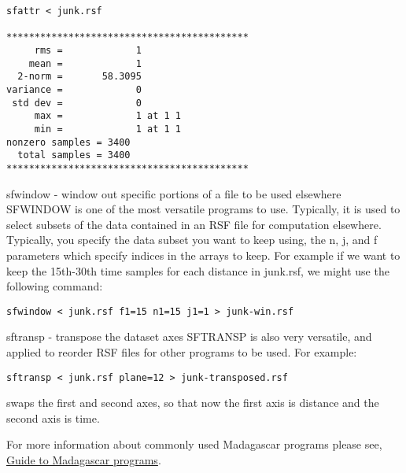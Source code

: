 \begin{verbatim}
sfattr < junk.rsf 
 
******************************************* 
     rms =             1 
    mean =             1 
  2-norm =       58.3095 
variance =             0 
 std dev =             0 
     max =             1 at 1 1 
     min =             1 at 1 1 
nonzero samples = 3400 
  total samples = 3400 
*******************************************
\end{verbatim}

sfwindow - window out specific portions of a file to be used elsewhere
SFWINDOW is one of the most versatile programs to use. Typically, it is used to select subsets of the data contained in an RSF file for computation elsewhere. Typically, you specify the data subset you want to keep using, the n, j, and f parameters which specify indices in the arrays to keep. For example if we want to keep the 15th-30th time samples for each distance in junk.rsf, we might use the following command:
\begin{verbatim}
sfwindow < junk.rsf f1=15 n1=15 j1=1 > junk-win.rsf
\end{verbatim}

sftransp - transpose the dataset axes
SFTRANSP is also very versatile, and applied to reorder RSF files for other programs to be used. For example:
\begin{verbatim}
sftransp < junk.rsf plane=12 > junk-transposed.rsf
\end{verbatim}
swaps the first and second axes, so that now the first axis is distance and the second axis is time.

For more information about commonly used Madagascar programs please see, \href{http://reproducibility.org/wiki/Guide_to_madagascar_programs}{Guide to Madagascar programs}.


